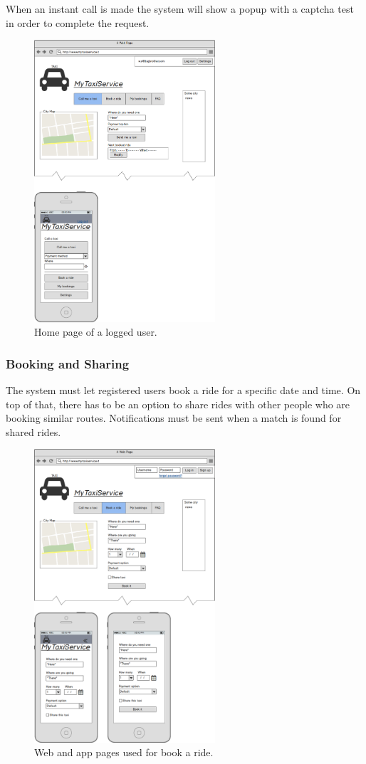 			When an instant call is made the system will show a popup with a captcha test in order to complete the request.
			\begin{figure}[h!]
				\includegraphics[width=0.6\textwidth]{mockup/homelog}
				\caption{Home page of a logged user.}
			\end{figure}
			\FloatBarrier
			\newpage
		\subsubsection {Booking and Sharing}
			The system must let registered users book a ride for a specific date and time. On top of that, there has to be an option to share
			rides with other people who are booking similar routes. Notifications must be sent when a match is found for shared rides.
			\begin{figure}[!h]
				\includegraphics[width=0.6\textwidth]{mockup/bookride}
				\caption{Web and app pages used for book a ride.}
			\end{figure}
			\newpage
